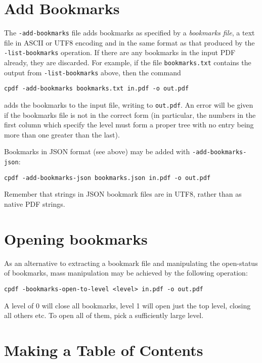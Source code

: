 \documentclass{book}
\begin{document}
  \section{Add Bookmarks}
  
  The \texttt{-add-bookmarks} file adds bookmarks as specified by a
\textit{bookmarks file}, a text file in ASCII or UTF8 encoding and in the same format as that produced by the
\texttt{-list-bookmarks} operation. If there are any bookmarks in the input PDF
already, they are discarded. For example, if the file \texttt{bookmarks.txt}
contains the output from \texttt{-list-bookmarks} above, then the command
  \begin{framed}
   \small\verb!cpdf -add-bookmarks bookmarks.txt in.pdf -o out.pdf!
  \end{framed}
\noindent adds the bookmarks to the input file, writing to \texttt{out.pdf}. An error
will be given if the bookmarks file is not in the correct form (in particular,
the numbers in the first column which specify the level must form a proper
tree with no entry being more than one greater than the last).

Bookmarks in JSON format (see above) may be added with \texttt{-add-bookmarks-json}:

  \begin{framed}
   \small\verb!cpdf -add-bookmarks-json bookmarks.json in.pdf -o out.pdf!
  \end{framed}

Remember that strings in JSON bookmark files are in UTF8, rather than as native PDF strings.

\section{Opening bookmarks}
As an alternative to extracting a bookmark file and manipulating the open-status of bookmarks, mass manipulation may be achieved by the following operation:

  \begin{framed}
   \small\verb!cpdf -bookmarks-open-to-level <level> in.pdf -o out.pdf!
  \end{framed}

\noindent A level of 0 will close all bookmarks, level 1 will open just the top level, closing all others etc. To open all of them, pick a sufficiently large level.


\section{Making a Table of Contents}
\end{document}
